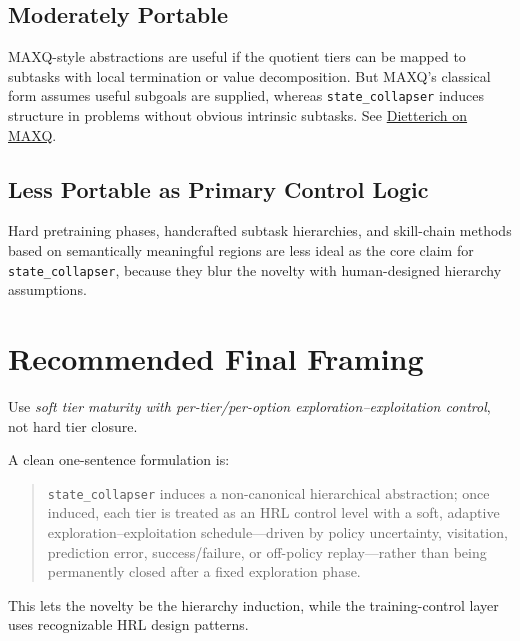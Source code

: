 \documentclass[11pt]{article}
\begin{document}
\subsection{Moderately Portable}

MAXQ-style abstractions are useful if the quotient tiers can be mapped to
subtasks with local termination or value decomposition. But MAXQ's classical
form assumes useful subgoals are supplied, whereas \texttt{state\_collapser}
induces structure in problems without obvious intrinsic subtasks. See
\href{https://www.jair.org/index.php/jair/article/view/10266}
{Dietterich on MAXQ}.

\subsection{Less Portable as Primary Control Logic}

Hard pretraining phases, handcrafted subtask hierarchies, and skill-chain
methods based on semantically meaningful regions are less ideal as the core
claim for \texttt{state\_collapser}, because they blur the novelty with
human-designed hierarchy assumptions.

\section{Recommended Final Framing}

Use \emph{soft tier maturity with per-tier/per-option
exploration--exploitation control}, not hard tier closure.

A clean one-sentence formulation is:

\begin{quote}
\texttt{state\_collapser} induces a non-canonical hierarchical abstraction;
once induced, each tier is treated as an HRL control level with a soft,
adaptive exploration--exploitation schedule---driven by policy uncertainty,
visitation, prediction error, success/failure, or off-policy replay---rather
than being permanently closed after a fixed exploration phase.
\end{quote}

This lets the novelty be the hierarchy induction, while the training-control
layer uses recognizable HRL design patterns.
\end{document}
